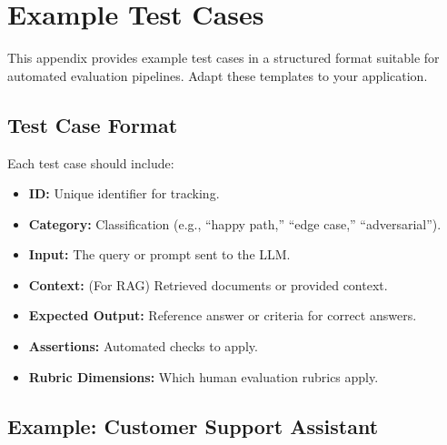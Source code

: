 
\section{Example Test Cases}
\label{app:example-tests}

This appendix provides example test cases in a structured format suitable for automated evaluation pipelines. Adapt these templates to your application.

\subsection{Test Case Format}

Each test case should include:
\begin{itemize}
    \item \textbf{ID:} Unique identifier for tracking.
    \item \textbf{Category:} Classification (e.g., ``happy path,'' ``edge case,'' ``adversarial'').
    \item \textbf{Input:} The query or prompt sent to the LLM.
    \item \textbf{Context:} (For RAG) Retrieved documents or provided context.
    \item \textbf{Expected Output:} Reference answer or criteria for correct answers.
    \item \textbf{Assertions:} Automated checks to apply.
    \item \textbf{Rubric Dimensions:} Which human evaluation rubrics apply.
\end{itemize}

\subsection{Example: Customer Support Assistant}

